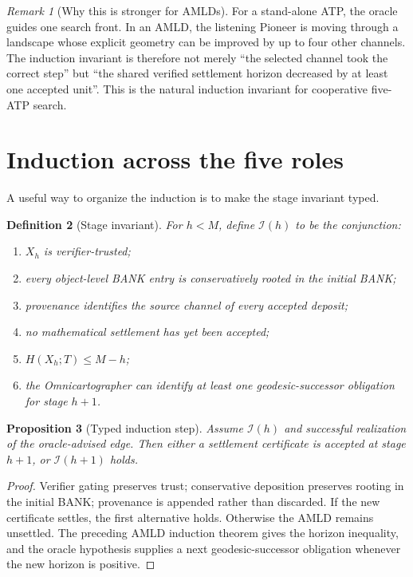 \documentclass[11pt]{article}
\newtheorem{definition}{Definition}[section]
\newtheorem{proposition}[definition]{Proposition}
\theoremstyle{remark}
\newtheorem{remark}[definition]{Remark}
\begin{document}
\begin{remark}[Why this is stronger for AMLDs]
For a stand-alone ATP, the oracle guides one search front. In an AMLD, the listening Pioneer is moving through a landscape whose explicit geometry can be improved by up to four other channels. The induction invariant is therefore not merely ``the selected channel took the correct step'' but ``the shared verified settlement horizon decreased by at least one accepted unit''. This is the natural induction invariant for cooperative five-ATP search.
\end{remark}

\section{Induction across the five roles}

A useful way to organize the induction is to make the stage invariant typed.

\begin{definition}[Stage invariant]
For $h<M$, define $\mathcal I(h)$ to be the conjunction:
\begin{enumerate}[label=(\alph*)]
\item $X_h$ is verifier-trusted;
\item every object-level BANK entry is conservatively rooted in the initial BANK;
\item provenance identifies the source channel of every accepted deposit;
\item no mathematical settlement has yet been accepted;
\item $H(X_h;T)\le M-h$;
\item the Omnicartographer can identify at least one geodesic-successor obligation for stage $h+1$.
\end{enumerate}
\end{definition}

\begin{proposition}[Typed induction step]
Assume $\mathcal I(h)$ and successful realization of the oracle-advised edge. Then either a settlement certificate is accepted at stage $h+1$, or $\mathcal I(h+1)$ holds.
\end{proposition}
\begin{proof}
Verifier gating preserves trust; conservative deposition preserves rooting in the initial BANK; provenance is appended rather than discarded. If the new certificate settles, the first alternative holds. Otherwise the AMLD remains unsettled. The preceding AMLD induction theorem gives the horizon inequality, and the oracle hypothesis supplies a next geodesic-successor obligation whenever the new horizon is positive.
\end{proof}
\end{document}
